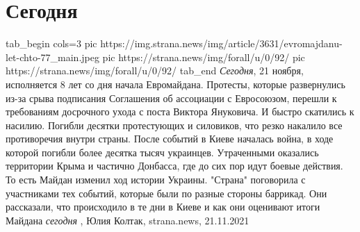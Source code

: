  
 
 
 
 
\chapter{Сегодня}
\label{sec:slova.segodnja}

\ifcmt
  tab_begin cols=3
     pic https://img.strana.news/img/article/3631/evromajdanu-let-chto-77_main.jpeg
     pic https://strana.news/img/forall/u/0/92/%
		 pic https://strana.news/img/forall/u/0/92/%
  tab_end
\fi
\emph{Сегодня}, 21 ноября, исполняется 8 лет со дня начала Евромайдана.  Протесты,
которые развернулись из-за срыва подписания Соглашения об ассоциации с
Евросоюзом, перешли к требованиям досрочного ухода с поста Виктора Януковича.
И быстро скатились к насилию.  Погибли десятки протестующих и силовиков, что
резко накалило все противоречия внутри страны.  После событий в Киеве началась
война, в ходе которой погибли более десятка тысяч украинцев. Утраченными
оказались территории Крыма и частично Донбасса, где до сих пор идут боевые
действия.  То есть Майдан изменил ход истории Украины.  "Страна" поговорила с
участниками тех событий, которые были по разные стороны баррикад. Они
рассказали, что происходило в те дни в Киеве и как они оценивают итоги Майдана
\emph{сегодня}
, 
Юлия Колтак, strana.news, 21.11.2021

